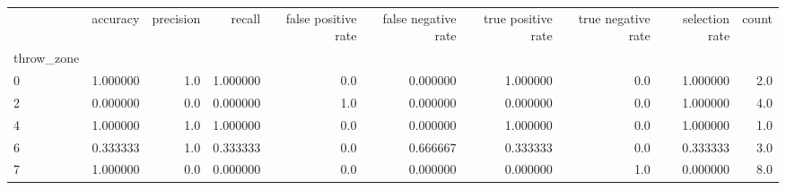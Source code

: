 \begin{tabular}{lrrrrrrrrr}
\toprule
{} &  accuracy &  precision &    recall &  false positive rate &  false negative rate &  true positive rate &  true negative rate &  selection rate &  count \\
throw\_zone &           &            &           &                      &                      &                     &                     &                 &        \\
\midrule
0          &  1.000000 &        1.0 &  1.000000 &                  0.0 &             0.000000 &            1.000000 &                 0.0 &        1.000000 &    2.0 \\
2          &  0.000000 &        0.0 &  0.000000 &                  1.0 &             0.000000 &            0.000000 &                 0.0 &        1.000000 &    4.0 \\
4          &  1.000000 &        1.0 &  1.000000 &                  0.0 &             0.000000 &            1.000000 &                 0.0 &        1.000000 &    1.0 \\
6          &  0.333333 &        1.0 &  0.333333 &                  0.0 &             0.666667 &            0.333333 &                 0.0 &        0.333333 &    3.0 \\
7          &  1.000000 &        0.0 &  0.000000 &                  0.0 &             0.000000 &            0.000000 &                 1.0 &        0.000000 &    8.0 \\
\bottomrule
\end{tabular}
